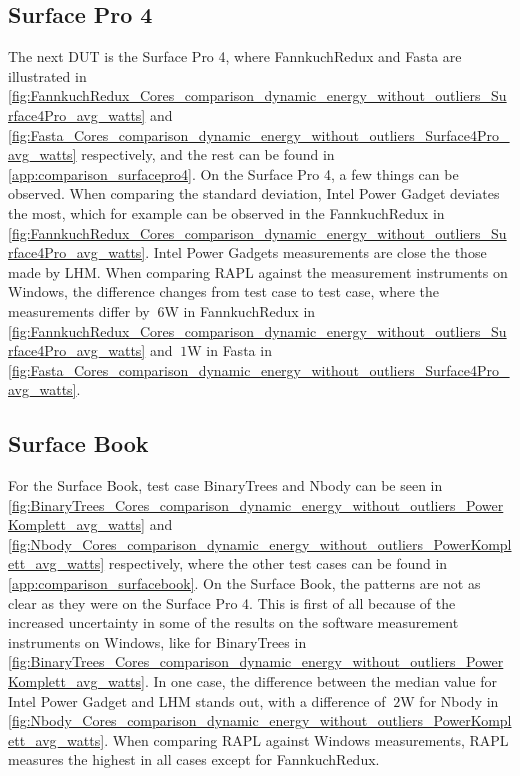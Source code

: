 \subsection{Surface Pro 4}




The next DUT is the Surface Pro 4, where FannkuchRedux and Fasta are illustrated in \cref{fig:FannkuchRedux_Cores_comparison_dynamic_energy_without_outliers_Surface4Pro_avg_watts} and \cref{fig:Fasta_Cores_comparison_dynamic_energy_without_outliers_Surface4Pro_avg_watts} respectively, and the rest can be found in \cref{app:comparison_surfacepro4}. On the Surface Pro 4, a few things can be observed. When comparing the standard deviation, Intel Power Gadget deviates the most, which for example can be observed in the FannkuchRedux in \cref{fig:FannkuchRedux_Cores_comparison_dynamic_energy_without_outliers_Surface4Pro_avg_watts}. Intel Power Gadgets measurements are close the those made by LHM. When comparing RAPL against the measurement instruments on Windows, the difference changes from test case to test case,  where the measurements differ by $~6$W in FannkuchRedux in \cref{fig:FannkuchRedux_Cores_comparison_dynamic_energy_without_outliers_Surface4Pro_avg_watts} and $~1$W in Fasta in \cref{fig:Fasta_Cores_comparison_dynamic_energy_without_outliers_Surface4Pro_avg_watts}.

\subsection{Surface Book}




For the Surface Book, test case BinaryTrees and Nbody can be seen in \cref{fig:BinaryTrees_Cores_comparison_dynamic_energy_without_outliers_PowerKomplett_avg_watts} and \cref{fig:Nbody_Cores_comparison_dynamic_energy_without_outliers_PowerKomplett_avg_watts} respectively, where the other test cases can be found in \cref{app:comparison_surfacebook}. On the Surface Book, the patterns are not as clear as they were on the Surface Pro 4. This is first of all because of the increased uncertainty in some of the results on the software measurement instruments on Windows, like for BinaryTrees in \cref{fig:BinaryTrees_Cores_comparison_dynamic_energy_without_outliers_PowerKomplett_avg_watts}. In one case, the difference between the median value for Intel Power Gadget and LHM stands out, with a difference of $~2$W for Nbody in \cref{fig:Nbody_Cores_comparison_dynamic_energy_without_outliers_PowerKomplett_avg_watts}. When comparing RAPL against Windows measurements, RAPL measures the highest in all cases except for FannkuchRedux.

